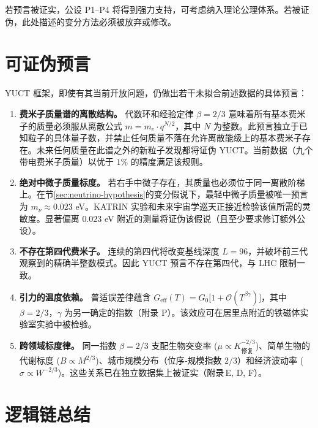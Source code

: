 \documentclass[12pt,a4paper]{article}
\begin{document}
	若预言被证实，公设 P1--P4 将得到强力支持，可考虑纳入理论公理体系。若被证伪，此处描述的变分方法必须被放弃或修改。
	
	\section{可证伪预言}
	
	YUCT 框架，即使有其当前开放问题，仍做出若干未拟合前述数据的具体预言：
	
	\begin{enumerate}[label=(\arabic*)]
		\item \textbf{费米子质量谱的离散结构。} 代数环和经验定律 \(\beta = 2/3\) 意味着所有基本费米子的质量必须服从离散公式 \(m = m_e \cdot q^{N/2}\)，其中 \(N\) 为整数。此预言独立于已知粒子的具体量子数，并禁止任何质量不落在允许离散能级上的基本费米子存在。未来任何质量在此谱之外的新粒子发现都将证伪 YUCT。当前数据（九个带电费米子质量）以优于 \(1\%\) 的精度满足该规则。
		\item \textbf{绝对中微子质量标度。} 若右手中微子存在，其质量也必须位于同一离散阶梯上。在节\ref{sec:neutrino-hypothesis}的变分假说下，最轻中微子质量被唯一预言为 \(m_{\nu} \approx 0.023\) eV。KATRIN 实验和未来宇宙学巡天正接近检验该值所需的灵敏度。显著偏离 \(0.023\) eV 附近的测量将证伪该假说（且至少要求修订额外公设）。
		\item \textbf{不存在第四代费米子。} 连续的第四代将改变基线深度 \(L = 96\)，并破坏前三代观察到的精确半整数模式。因此 YUCT 预言不存在第四代，与 LHC 限制一致。
		\item \textbf{引力的温度依赖。} 普适误差律蕴含 \(G_{\mathrm{eff}}(T) = G_0\bigl[1 + \mathcal{O}(T^{\beta\gamma})\bigr]\)，其中 \(\beta = 2/3\)，\(\gamma\) 为另一确定的指数（附录 P）。该效应可在居里点附近的铁磁体实验室实验中被检验。
		\item \textbf{跨领域标度律。} 同一指数 \(\beta = 2/3\) 支配生物突变率 (\(\mu \propto K_{\text{修复}}^{-2/3}\))、简单生物的代谢标度 (\(B \propto M^{2/3}\))、城市规模分布（位序‑规模指数 \(2/3\)）和经济波动率 (\(\sigma \propto W^{-2/3}\))。这些关系已在独立数据集上被证实（附录 E, D, F）。
	\end{enumerate}
	
	\section{逻辑链总结}
	
\end{document}
